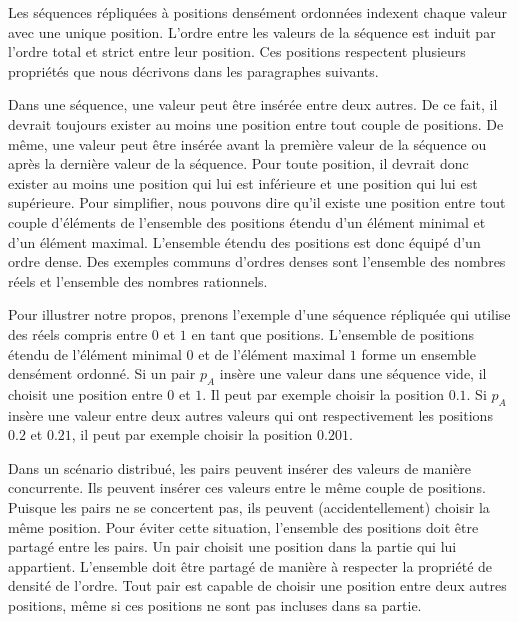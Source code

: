 \medskip

Les séquences répliquées à positions densément ordonnées indexent chaque valeur avec une unique position.
L'ordre entre les valeurs de la séquence est induit par l'ordre total et strict entre leur position.
Ces positions respectent plusieurs propriétés que nous décrivons dans les paragraphes suivants.

\medskip

Dans une séquence, une valeur peut être insérée entre deux autres.
De ce fait, il devrait toujours exister au moins une position entre tout couple de positions.
De même, une valeur peut être insérée avant la première valeur de la séquence ou après la dernière valeur de la séquence.
Pour toute position, il devrait donc exister au moins une position qui lui est inférieure et une position qui lui est supérieure.
Pour simplifier, nous pouvons dire qu'il existe une position entre tout couple d'éléments de l'ensemble des positions étendu d'un élément minimal et d'un élément maximal.
L'ensemble étendu des positions est donc équipé d'un ordre dense.
Des exemples communs d'ordres denses sont l'ensemble des nombres réels et l'ensemble des nombres rationnels.

\medskip

Pour illustrer notre propos, prenons l'exemple d'une séquence répliquée qui utilise des réels compris entre $0$ et $1$ en tant que positions.
L'ensemble de positions étendu de l'élément minimal $0$ et de l'élément maximal $1$ forme un ensemble densément ordonné.
Si un pair $p_A$ insère une valeur dans une séquence vide, il choisit une position entre $0$ et $1$.
Il peut par exemple choisir la position $0.1$.
Si $p_A$ insère une valeur entre deux autres valeurs qui ont respectivement les positions $0.2$ et $0.21$, il peut par exemple choisir la position $0.201$.

\medskip

Dans un scénario distribué, les pairs peuvent insérer des valeurs de manière concurrente.
Ils peuvent insérer ces valeurs entre le même couple de positions.
Puisque les pairs ne se concertent pas, ils peuvent (accidentellement) choisir la même position.
Pour éviter cette situation, l'ensemble des positions doit être partagé entre les pairs.
Un pair choisit une position dans la partie qui lui appartient.
L'ensemble doit être partagé de manière à respecter la propriété de densité de l'ordre.
Tout pair est capable de choisir une position entre deux autres positions, même si ces positions ne sont pas incluses dans sa partie.

